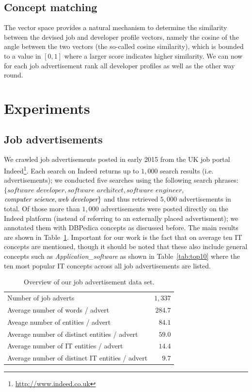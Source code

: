\documentclass[conference]{IEEEtran}
\begin{document}
\subsection{Concept matching}

The vector space provides a natural mechanism to determine the similarity
between the devised job and developer profile vectors, namely the cosine of the
angle between the two vectors (the so-called cosine similarity), which is
bounded to a value in $[0,1]$ where a larger score indicates higher similarity.
We can now for each job advertisement rank all developer profiles as well as the
other way round.

\section{Experiments}

\subsection{Job advertisements} 
We crawled job advertisements posted in early 2015 from the UK job portal  Indeed\footnote{\url{http://www.indeed.co.uk}}. Each search on Indeed returns up to $1,000$ search results (i.e. advertisements); we conducted five searches using the following search phrases: $\{\textit{software developer}, \textit{software architect}, \textit{software engineer},$ $\emph{computer science}, \emph{web developer}\}$ and thus retrieved $5,000$ advertisements in total. Of those more than $1,000$ advertisements were posted directly on the Indeed platform (instead of referring to an externally placed advertisment); we annotated them with DBPedica concepts as discussed before. The main results are shown in Table~\ref{tab:jobadverts}. Important for our work is the fact that on average ten IT concepts are mentioned, though it should be noted that these also include general concepts such as \emph{Application\_software} as shown in Table~\ref{tab:top10} where the ten most popular IT concepts across all job advertisements are listed.

\begin{table}
\centering
\begin{tabular}{lr}
\toprule
Number of job adverts								& $1,337$\\
Average number of words / advert 			& $284.7$\\
\midrule
Aveage number of entities / advert			& $84.1$\\
Average number of  distinct entities / advert	& $59.0$\\
\midrule
Average number of IT entities / advert	& $14.4$\\
Average number of distinct IT entities / advert& $9.7$\\

\bottomrule
\end{tabular}
\caption{Overview of our job advertisement data set.}
\label{tab:jobadverts}
\end{table}
\end{document}
